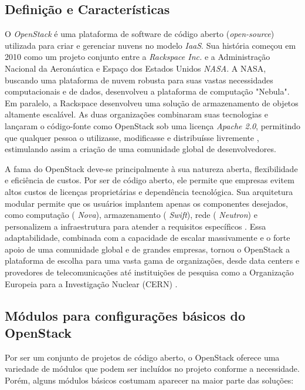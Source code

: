 \label{sec:openstack}

\subsection{Definição e Características}

O  \textit{OpenStack} é uma plataforma de software de código aberto (\textit{open-source}) utilizada para criar e gerenciar nuvens no modelo \textit{IaaS}. Sua história começou em 2010 como um projeto conjunto entre a  \textit{Rackspace Inc.} e a Administração Nacional da Aeronáutica e Espaço dos Estados Unidos \textit{NASA}. A NASA, buscando uma plataforma de nuvem robusta para suas vastas necessidades computacionais e de dados, desenvolveu a plataforma de computação "Nebula". Em paralelo, a Rackspace desenvolveu uma solução de armazenamento de objetos altamente escalável. As duas organizações combinaram suas tecnologias e lançaram o código-fonte como OpenStack sob uma licença  \textit{Apache 2.0}, permitindo que qualquer pessoa o utilizasse, modificasse e distribuísse livremente \cite{nasa2012}, estimulando assim a criação de uma comunidade global de desenvolvedores.

A fama do OpenStack deve-se principalmente à sua natureza aberta, flexibilidade e eficiência de custos. Por ser de código aberto, ele permite que empresas evitem altos custos de licenças proprietárias e dependência tecnológica. Sua arquitetura modular permite que os usuários implantem apenas os componentes desejados, como computação ( \textit{Nova}), armazenamento ( \textit{Swift}), rede ( \textit{Neutron}) e personalizem a infraestrutura para atender a requisitos específicos \cite{grzonka2015}. Essa adaptabilidade, combinada com a capacidade de escalar massivamente e o forte apoio de uma comunidade global e de grandes empresas, tornou o OpenStack a plataforma de escolha para uma vasta gama de organizações, desde data centers e provedores de telecomunicações até instituições de pesquisa como a Organização Europeia para a Investigação Nuclear (CERN) \cite{rousseau2019}.

\subsection{Módulos para configurações básicos do OpenStack}

Por ser um conjunto de projetos de código aberto, o OpenStack oferece uma variedade de módulos que podem ser incluídos no projeto conforme a necessidade. Porém, alguns módulos básicos costumam aparecer na maior parte das soluções:

